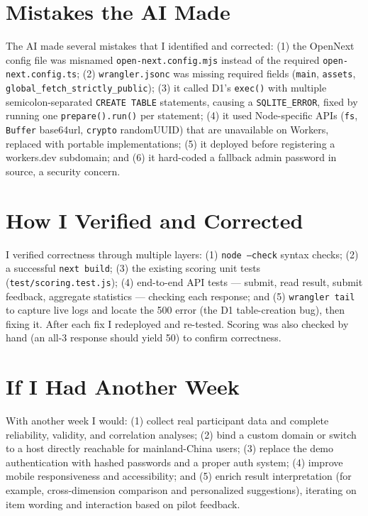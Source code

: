 \documentclass[11pt,a4paper]{article}
\begin{document}
\section{Mistakes the AI Made}

The AI made several mistakes that I identified and corrected: (1) the OpenNext config file was misnamed \texttt{open-next.config.mjs} instead of the required \texttt{open-next.config.ts}; (2) \texttt{wrangler.jsonc} was missing required fields (\texttt{main}, \texttt{assets}, \texttt{global\_fetch\_strictly\_public}); (3) it called D1's \texttt{exec()} with multiple semicolon-separated \texttt{CREATE TABLE} statements, causing a \texttt{SQLITE\_ERROR}, fixed by running one \texttt{prepare().run()} per statement; (4) it used Node-specific APIs (\texttt{fs}, \texttt{Buffer} base64url, \texttt{crypto} randomUUID) that are unavailable on Workers, replaced with portable implementations; (5) it deployed before registering a workers.dev subdomain; and (6) it hard-coded a fallback admin password in source, a security concern.

\section{How I Verified and Corrected}

I verified correctness through multiple layers: (1) \texttt{node --check} syntax checks; (2) a successful \texttt{next build}; (3) the existing scoring unit tests (\texttt{test/scoring.test.js}); (4) end-to-end API tests --- submit, read result, submit feedback, aggregate statistics --- checking each response; and (5) \texttt{wrangler tail} to capture live logs and locate the 500 error (the D1 table-creation bug), then fixing it. After each fix I redeployed and re-tested. Scoring was also checked by hand (an all-3 response should yield 50) to confirm correctness.

\section{If I Had Another Week}

With another week I would: (1) collect real participant data and complete reliability, validity, and correlation analyses; (2) bind a custom domain or switch to a host directly reachable for mainland-China users; (3) replace the demo authentication with hashed passwords and a proper auth system; (4) improve mobile responsiveness and accessibility; and (5) enrich result interpretation (for example, cross-dimension comparison and personalized suggestions), iterating on item wording and interaction based on pilot feedback.
\end{document}
